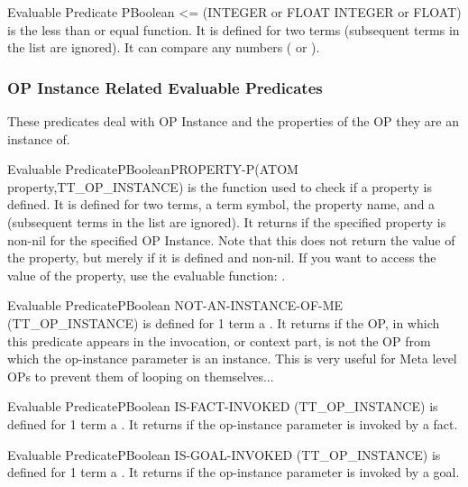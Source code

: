 \begin{typeep}{Evaluable Predicate} {PBoolean} {<=} {(INTEGER or FLOAT INTEGER or FLOAT)}
is the less than or equal function. It is defined for two terms
(subsequent terms in the list are ignored). It can compare any numbers
( or ).
\end{typeep}

\subsubsection{OP Instance Related Evaluable Predicates}

These predicates deal with OP Instance and the properties of the OP they are an
instance of.

\begin{typeep}{Evaluable Predicate}{PBoolean}{PROPERTY-P}{(ATOM property,TT\_OP\_INSTANCE)}
is the function used to check if a property is defined.  It is defined for
two terms, a term symbol, the property name, and a 
(subsequent terms in the list are ignored). It returns  if the
specified property is non-nil for the specified OP Instance. Note that
this does not return the value of the property, but merely if it is
defined and non-nil. If you want to access the value of the property, use
the evaluable function: .
\end{typeep}

\begin{typeep}{Evaluable Predicate}{PBoolean} {NOT-AN-INSTANCE-OF-ME} {(TT\_OP\_INSTANCE)}
is defined for 1 term a . It returns  if
the OP, in which this predicate appears in the invocation, or context part, is
not the OP from which the op-instance parameter is an instance. This is very
useful for Meta level OPs to prevent them of looping on themselves...
\end{typeep}

\begin{typeep}{Evaluable Predicate}{PBoolean} {IS-FACT-INVOKED} {(TT\_OP\_INSTANCE)}
is defined for 1 term a . It returns  if
the op-instance parameter is invoked by a fact.
\end{typeep}

\begin{typeep}{Evaluable Predicate}{PBoolean} {IS-GOAL-INVOKED} {(TT\_OP\_INSTANCE)}
is defined for 1 term a . It returns  if
the op-instance parameter is invoked by a goal.
\end{typeep}

